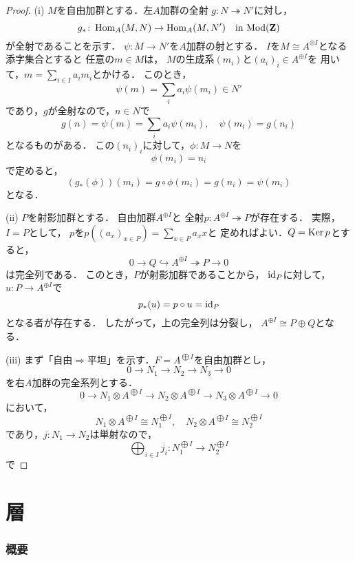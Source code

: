 \begin{proof}
    (i) 
    \(M\)を自由加群とする．左\(A\)加群の全射
    \(g\colon N\twoheadrightarrow N'\)に対し，\[
        g_\ast\colon\mathop{\mathrm{Hom}}\nolimits_A(M,N)\to\mathop{\mathrm{Hom}}\nolimits_A(M,N') 
        \quad\text{in \(\mathop{\mathrm{Mod}}\nolimits(\mathbf{Z})\)}
    \]が全射であることを示す．
    \(\psi\colon M\to N'\)を\(A\)加群の射とする．
    \(I\)を\(M\cong A^{\oplus I}\)となる添字集合とすると
    任意の\(m\in M\)は，
    \(M\)の生成系\((m_i)\)と\((a_i)_i\in A^{\oplus I}\)を
    用いて，\(m=\sum_{i\in I}a_im_i\)とかける．
    このとき，\[
        \psi(m)=\sum_{i}a_i\psi(m_i)\in N'
    \]であり，\(g\)が全射なので，\(n\in N\)で\[
        g(n)=\psi(m)=\sum_{i}a_i\psi(m_i),
        \quad
        \psi(m_i)=g(n_i)
    \]となるものがある．
    この\((n_i)_i\)に対して，\(\phi\colon M\to N\)を
    \[
        \phi(m_i)=n_i
    \]で定めると，
    \[
        \left(g_\ast(\phi)\right)(m_i)=g\circ\phi(m_i)=g(n_i)=\psi(m_i)
    \]となる．
    
    (ii) 
    \(P\)を射影加群とする．
    自由加群\(A^{\oplus I}\)と
    全射\(p\colon A^{\oplus I}\twoheadrightarrow P\)が存在する．
    実際，\(I= P\)として，
    \(p\)を\(p((a_x)_{x\in P})=\sum_{x\in P}a_xx\)と
    定めればよい．\(Q=\mathop{\mathrm{Ker}}\nolimits p\)とすると，\[
        0\to Q\hookrightarrow A^{\oplus I}\twoheadrightarrow P\to0
    \]は完全列である．
    このとき，\(P\)が射影加群であることから，
    \(\mathop{\mathrm{id}}\nolimits_P\)に対して，\(u\colon P\to A^{\oplus I}\)で
    \[p_\ast(u)=p\circ u=\mathop{\mathrm{id}}\nolimits_P\]となる者が存在する．
    したがって，上の完全列は分裂し，
    \(A^{\oplus I}\cong P\oplus Q\)となる．
    
    (iii) 
    まず「自由\(\Rightarrow\)平坦」を示す．\(F=A^{\bigoplus I}\)を自由加群とし，\[
        0\to N_1\to N_2\to N_3\to0
    \]を右\(A\)加群の完全系列とする．\[
        0\to N_1\otimes A^{\bigoplus I}\to N_2\otimes A^{\bigoplus I}\to N_3\otimes A^{\bigoplus I}\to0
    \]において，\[
        N_1\otimes A^{\bigoplus I}\cong N_1^{\bigoplus I},\quad
        N_2\otimes A^{\bigoplus I}\cong N_2^{\bigoplus I}
    \]であり，\(j\colon N_1\to N_2\)は単射なので，\[
        \bigoplus_{i\in I}j_i\colon N_1^{\bigoplus I}\to N_2^{\bigoplus I}
    \]で
\end{proof}


\clearpage
\chapter{層}

\subsection*{概要}

